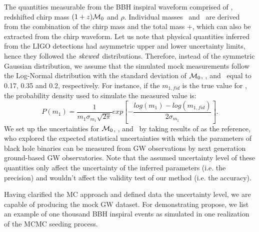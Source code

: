 \documentclass[twocolumn]{aastex62}
\newcommand{\kai}[1]{\textcolor{red}{[{\bf Kai}: #1]}}
\newcommand{\blue}[1]{{#1}}
\begin{document}
The quantities measurable from the BBH inspiral waveform comprised of \dl, redshifted chirp mass $(1+z){\cal M}_0 $ and $\rho$. Individual masses \mone\ and \mtwo\ are derived from the combination of the chirp mass and the total mass \mone+\mtwo, which can also be extracted from the chirp waveform. 
\blue{Let us note that physical quantities inferred from the LIGO detections had asymmetric upper and lower uncertainty limits, hence they followed the  ${\it skewed}$  distributions. Therefore, instead of the symmetric Gaussian distribution, we assume that the simulated mock measurements follow the Log-Normal distribution with the standard deviation of  ${\cal M}_0$, \dl, and \mone\ equal to 0.17, 0.35 and 0.2, respectively.}
For instance, if the $m_{1,fid}$ is the true value for \mone, \blue{the probability density used to simulate the measured value} is:
 \begin{equation} \label{equ_lognorm}
P(m_1) = \frac{1}{m_1 \sigma_{m_1} \sqrt{2\pi}} exp \left[- \frac{log(m_1)-log(m_{1,fid})}{2\sigma_{m_1}} \right].
 \end{equation}
\blue{We set up the uncertainties for ${\cal M}_0$, \dl, and \mone\ by taking results of \citet{Ghosh2016} as the reference, who explored the expected statistical uncertainties with which the parameters of black hole binaries can be measured from GW observations by next generation ground-based GW observatories. Note that the assumed uncertainty level of these quantities only affect the uncertainty of the inferred parameters (i.e. the precision) and wouldn't affect the validity test of our method (i.e. the  accuracy).
}
 

Having clarified the MC approach and defined data the uncertainty level, we are capable of producing the mock GW dataset. For demonstrating propose, we list an example of one thousand BBH inspiral events as simulated in one realization of the MCMC seeding process. %
\end{document}
